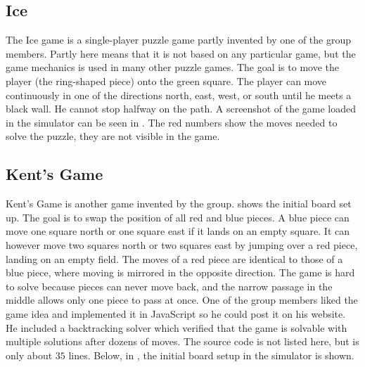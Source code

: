 \subsection{Ice}
The Ice game is a single-player puzzle game partly invented by one
of the group members. Partly here means that it is not based on any
particular game, but the game mechanics is used in many other puzzle
games. The goal is to move the player (the ring-shaped piece) onto the
green square. The player can move continuously in one of the directions
north, east, west, or south until he meets a black wall. He cannot stop
halfway on the path. A screenshot of the game loaded in the simulator
can be seen in . The red numbers show the moves
needed to solve the puzzle, they are not visible in the game.


\subsection{Kent's Game}
Kent's Game is another game invented by the group.
 shows the initial board set up. The
goal is to swap the position of all red and blue pieces. A blue piece
can move one square north or one square east if it lands on an empty
square. It can however move two squares north or two squares east by
jumping over a red piece, landing on an empty field. The moves of a
red piece are identical to those of a blue piece, where moving is
mirrored in the opposite direction. The game is hard to solve because
pieces can never move back, and the narrow passage in the middle allows
only one piece to pass at once. One of the group members liked the
game idea and implemented it in JavaScript so he could post it on his
website. He included a backtracking solver which verified that the
game is solvable with multiple solutions after dozens of moves. The
source code is not listed here, but is only about $35$ lines. Below, in
, the initial board setup in the simulator
is shown.

